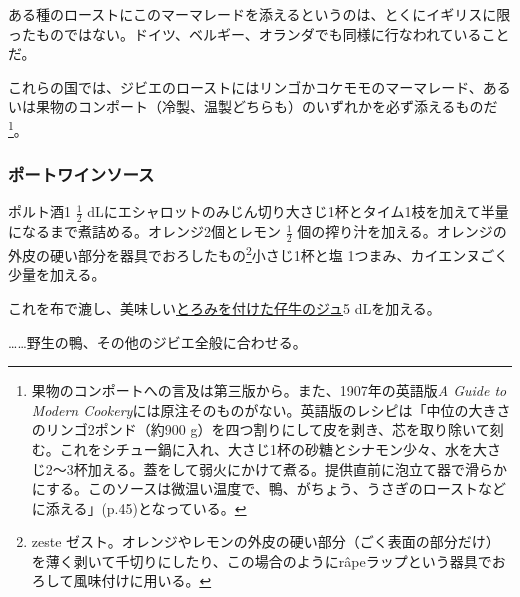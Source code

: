 \begin{recette}
ある種のローストにこのマーマレードを添えるというのは、とくにイギリスに限ったものではない。ドイツ、ベルギー、オランダでも同様に行なわれていることだ。

これらの国では、ジビエのローストにはリンゴかコケモモのマーマレード、あるいは果物のコンポート（冷製、温製どちらも）のいずれかを必ず添えるものだ\footnote{果物のコンポートへの言及は第三版から。また、1907年の英語版\emph{A
  Guide to Modern
  Cookery}には原注そのものがない。英語版のレシピは「中位の大きさのリンゴ2ポンド（約900
  g）を四つ割りにして皮を剥き、芯を取り除いて刻む。これをシチュー鍋に入れ、大さじ1杯の砂糖とシナモン少々、水を大さじ2〜3杯加える。蓋をして弱火にかけて煮る。提供直前に泡立て器で滑らかにする。このソースは微温い温度で、鴨、がちょう、うさぎのローストなどに添える」(p.45)となっている。}。

\atoaki{}

\hypertarget{porto-wine-sauce}{%
\subsubsection{ポートワインソース}\label{porto-wine-sauce}}



ポルト酒1 \(\frac{1}{2}\)
dLにエシャロットのみじん切り大さじ1杯とタイム1枝を加えて半量になるまで煮詰める。オレンジ2個とレモン
\(\frac{1}{2}\)
個の搾り汁を加える。オレンジの外皮の硬い部分を器具でおろしたもの\footnote{zeste
  ゼスト。オレンジやレモンの外皮の硬い部分（ごく表面の部分だけ）を薄く剥いて千切りにしたり、この場合のようにrâpeラップという器具でおろして風味付けに用いる。}小さじ1杯と塩
1つまみ、カイエンヌごく少量を加える。

これを布で漉し、美味しい\protect\hyperlink{jus-de-veau-lie}{とろみを付けた仔牛のジュ}5
dLを加える。

\ldots{}\ldots{}野生の鴨、その他のジビエ全般に合わせる。


\end{recette}
